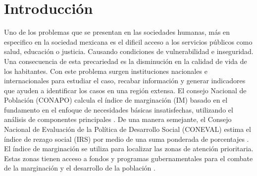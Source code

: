 \section{Introducción}

Uno de los problemas que se presentan en las sociedades humanas, más en especifico en la sociedad mexicana es el dificil acceso a los servicios públicos como salud, educación o justicia. Causando condiciones de vulnerabilidad e inseguridad. Una consecuencia de esta precariedad es la disminución en la calidad de vida de los habitantes. Con este problema surgen instituciones nacionales e internacionales para estudiar el caso, recabar información y generar indicadores que ayuden a identificar los casos en una región extensa. El consejo Nacional de Población (CONAPO) calcula el índice de marginación (IM) basado en el fundamento en el enfoque de necesidades básicas insatisfechas, utilizando el análisis de componentes principales \cite{conapo_2021}. De una manera semejante, el Consejo Nacional de Evaluación de la Política de Desarrollo Social (CONEVAL) estima el índice de rezago social (IRS) por medio de una suma ponderada de porcentajes \cite{CONEVAL_2007}. El índice de marginación se utiliza para localizar las zonas de atención prioritaria. Estas zonas tienen acceso a fondos y programas gubernamentales para el combate de la marginación y el desarrollo de la población \cite{DOF_2011,DOF_2012,DOF_2013,DOF_2014,DOF_2015,DOF_2016,DOF_2017,DOF_2018,DOF_2019}.

